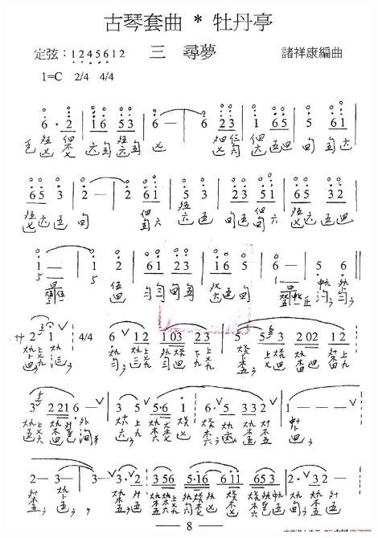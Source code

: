 \documentclass[cn,pad,twocol]{elegantbook}
\begin{document}
\paragraph*{\includegraphics[width=0.9\textwidth]{mudanting/2021-牡丹亭-08寻梦}} 
\end{document}
